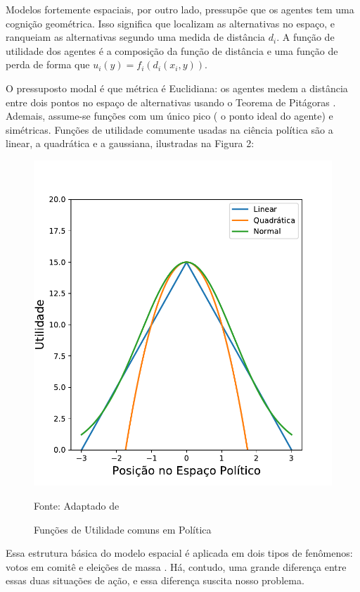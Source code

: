 Modelos fortemente espaciais, por outro lado, pressupõe que os agentes tem uma
cognição geométrica. Isso significa que localizam as alternativas no espaço, e
ranqueiam as alternativas segundo uma medida de distância \(d_i\). A função de
utilidade dos agentes é a composição da função de distância e uma função de
perda de forma que \(u_i(y) = f_i(d_i(x_i,y)) \).

O pressuposto modal  é que métrica é Euclidiana: os agentes
medem a distância entre dois pontos no espaço de alternativas usando o Teorema
de Pitágoras \cite{munger2015choosing}. Ademais, assume-se funções com um único
pico ( o ponto ideal do agente) e simétricas. Funções de utilidade comumente
usadas na ciência política são a linear, a quadrática e a gaussiana, ilustradas
na  Figura 2: 


\begin{figure}[H]
  \centering \includegraphics[scale = 0.6]{ims/utilities.pdf}
  \caption{Funções de Utilidade comuns em Política}
  Fonte: Adaptado de 
\end{figure}

Essa estrutura básica do modelo espacial é aplicada em dois tipos de fenômenos:
votos em comitê e eleições de massa \cite{munger2015choosing}. Há, contudo, uma
grande diferença entre essas duas situações de ação, e essa diferença suscita
nosso problema.


